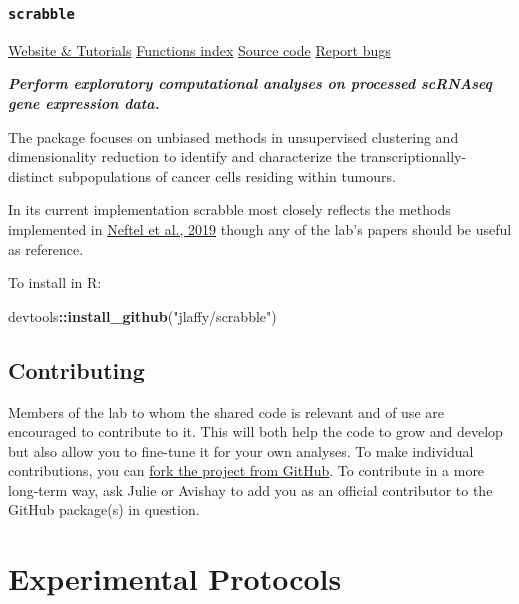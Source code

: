 \documentclass[]{book}
\newenvironment{Shaded}{\begin{snugshade}}{\end{snugshade}}
\newcommand{\KeywordTok}[1]{\textcolor[rgb]{0.13,0.29,0.53}{\textbf{#1}}}
\newcommand{\StringTok}[1]{\textcolor[rgb]{0.31,0.60,0.02}{#1}}
\newcommand{\OperatorTok}[1]{\textcolor[rgb]{0.81,0.36,0.00}{\textbf{#1}}}
\newcommand{\NormalTok}[1]{#1}
\begin{document}
\subsection{\texorpdfstring{\texttt{scrabble}}{scrabble}}\label{scrabble}

\href{https://jlaffy.github.io/scrabble}{Website \& Tutorials}
\textbar{}
\href{https://jlaffy.github.io/scrabble/reference/index.html}{Functions
index} \textbar{} \href{https://github.com/jlaffy/scrabble}{Source code}
\textbar{} \href{https://github.com/jlaffy/scrabble/issues}{Report bugs}

\emph{\textbf{Perform exploratory computational analyses on processed
scRNAseq gene expression data.}}

The package focuses on unbiased methods in unsupervised clustering and
dimensionality reduction to identify and characterize the
transcriptionally-distinct subpopulations of cancer cells residing
within tumours.

In its current implementation scrabble most closely reflects the methods
implemented in
\href{https://www.ncbi.nlm.nih.gov/pubmed/31327527}{Neftel et al., 2019}
though any of the lab's papers should be useful as reference.

To install in R:

\begin{Shaded}
\begin{Highlighting}[]
\NormalTok{devtools}\OperatorTok{::}\KeywordTok{install_github}\NormalTok{(}\StringTok{"jlaffy/scrabble"}\NormalTok{)}
\end{Highlighting}
\end{Shaded}

\section{Contributing}\label{contributing}

Members of the lab to whom the shared code is relevant and of use are
encouraged to contribute to it. This will both help the code to grow and
develop but also allow you to fine-tune it for your own analyses. To
make individual contributions, you can
\href{https://help.github.com/en/github/getting-started-with-github/fork-a-repo}{fork
the project from GitHub}. To contribute in a more long-term way, ask
Julie or Avishay to add you as an official contributor to the GitHub
package(s) in question.

\chapter{Experimental Protocols}\label{protocols}
\end{document}
